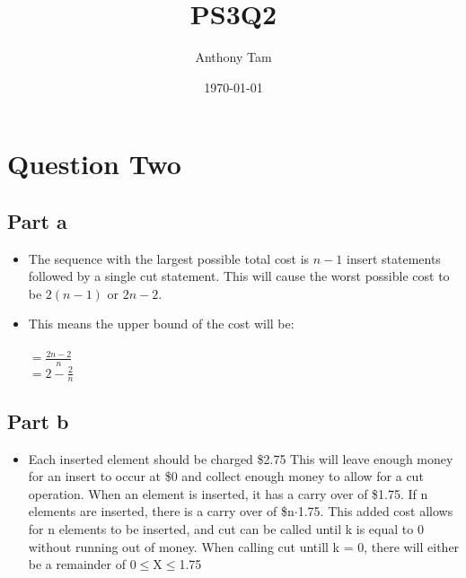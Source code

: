 \documentclass[11pt]{article}
\author{Anthony Tam}
\date{\today}
\title{PS3Q2}
\begin{document}
\maketitle
\tableofcontents

\section{Question Two}
\label{sec-1}
\subsection{Part a}
\label{sec-1-1}
\begin{itemize}
\item The sequence with the largest possible total cost is $n - 1$ insert
statements followed by a single cut statement. This will cause the
worst possible cost to be $2(n - 1)$ or $2n - 2$.
\item This means the upper bound of the cost will be:\\\\
$= \frac{2n - 2}{n}$\\
$= 2 - \frac{2}{n}$
\end{itemize}
\subsection{Part b}
\label{sec-1-2}
\begin{itemize}
\item Each inserted element should be charged \$2.75 This will leave enough
money for an insert to occur at \$0 and collect enough money to allow
for a cut operation. When an element is inserted, it has a carry over
of \$1.75. If n elements are inserted, there is a carry over of \$n$\cdot$1.75.
This added cost allows for n elements to be inserted, and cut can be 
called until k is equal to 0 without running out of money. When calling
cut untill k = 0, there will either be a remainder of 0$\le$X$\le$1.75
\end{itemize}
\end{document}
